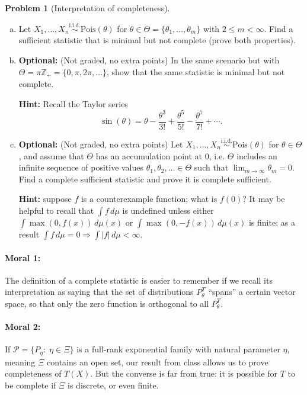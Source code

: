 \documentclass{article}
\newcommand{\cP}{\mathcal{P}}
\newcommand{\ZZ}{\mathbb{Z}}
\newcommand{\simiid}{\overset{\text{i.i.d.}}{\sim}}
\newcommand{\optional}{{\bf Optional:} (Not graded, no extra points) }
\theoremstyle{definition}
\newtheorem{problem}{Problem}
\begin{document}
\begin{problem}[Interpretation of completeness]
\begin{enumerate}[(a)]
\item Let $X_1,\ldots,X_n \simiid \text{Pois}(\theta)$ for $\theta\in \Theta = \{\theta_1,\ldots, \theta_m\}$ with $2 \leq m < \infty$. Find a sufficient statistic that is minimal but not complete (prove both properties).

  

\item \optional In the same scenario but with $\Theta = \pi\ZZ_+ = \{0, \pi, 2\pi, \ldots\}$, show that the same statistic is minimal but not complete.

{\bf Hint:} Recall the Taylor series 
\[
\sin(\theta) = \theta - \frac{\theta^3}{3!} + \frac{\theta^5}{5!} - \frac{\theta^7}{7!} + \cdots.
\]



\item \optional  Let $X_1,\ldots,X_n \simiid \text{Pois}(\theta)$ for $\theta\in \Theta$, and assume that $\Theta$ has an accumulation point at 0, i.e. $\Theta$ includes an infinite sequence of positive values $\theta_1,\theta_2,\ldots\in \Theta$ such that $\lim_{m\to\infty} \theta_m = 0$. Find a complete sufficient statistic and prove it is complete sufficient. 

{\bf Hint:} suppose $f$ is a counterexample function; what is $f(0)$? It may be helpful to recall that $\int f\,d  \mu$ is undefined unless either $\int \max(0,f(x))\,d  \mu(x)$ or $\int \max(0, -f(x))\,d  \mu(x)$ is finite; as a result $\int f\,d  \mu = 0 \Rightarrow \int|f|\,d  \mu < \infty$.


\end{enumerate}

\paragraph{Moral 1:} The definition of a complete statistic is easier to remember if we recall its interpretation as saying that the set of distributions $P_\theta^T$ ``spans'' a certain vector space, so that only the zero function is orthogonal to all $P_\theta^T$.

\paragraph{Moral 2:} If $\cP = \{P_\eta:\; \eta \in \Xi\}$ is a full-rank exponential family with natural parameter $\eta$, meaning $\Xi$ contains an open set, our result from class allows us to prove completeness of $T(X)$. But the converse is far from true: it is possible for $T$ to be complete if $\Xi$ is discrete, or even finite.
\end{problem}
\end{document}
